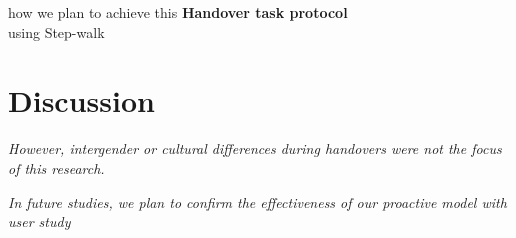 how we plan to achieve this \textbf{Handover task protocol\\} using Step-walk



%
%
%



\section{Discussion}

\textit{However, intergender or cultural differences during handovers were not the
	focus of this research.}


\textit{In future studies, we plan to confirm the effectiveness of our proactive model with user study}


\clearpage




